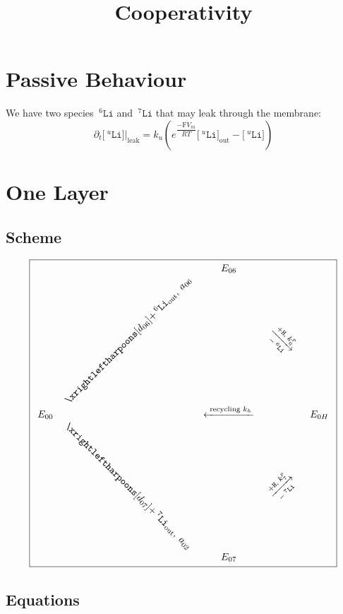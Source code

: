 \documentclass[aps,onecolumn,11pt]{revtex4}
\newcommand{\mychem}[1]{\mathtt{#1}}
\newcommand{\myconc}[1]{\big[#1\big]}
\newcommand{\Faraday}{\mathrm{F}}
\newcommand{\spLi}[1]{{\!~^{#1}\mychem{Li}}}
\newcommand{\Li}[1]{\myconc{\spLi{#1}}}
\newcommand{\spproton}{\mychem{H}}
\newcommand{\myleak}[1]{\left.{#1}\right\vert_{\mathrm{leak}}}
\newcommand{\myout}[1]{{#1}_{\mathrm{out}}}
\newcommand{\LiOut}[1]{\myout{\Li{#1}}}
\newcommand{\spLiOut}[1]{\myout{\spLi{#1}}}
\newcommand{\myrotate}[2]{\rotatebox[origin=c]{#1}{#2}}
\begin{document}
\title{Cooperativity}
\maketitle


\section{Passive Behaviour}
We have two species $\spLi{6}$ and $\spLi{7}$ that may leak through the membrane:
\begin{equation}
	\partial_t \myleak{\Li{u}} = k_u \left( e^{\dfrac{-\Faraday V_m }{RT}} \LiOut{u} - \Li{u}\right)
\end{equation}

\section{One Layer}

\subsection{Scheme}
{
\Large
\begin{equation}
\boxed{
\begin{array}{ccccc}
 & & E_{06}  &  & \\
 &  \myrotate{45}{$\xrightleftharpoons[d_{06}]{+\spLiOut{6},\;a_{06}}$} &   & \myrotate{-45}{$\xrightarrow[-\spLi{6}]{+ \spproton, \; k^p_6}$} &  \\
E_{00}  &  & \xleftarrow{\text{ recycling } k_h } &   & E_{0H} \\
  & \myrotate{-45}{$\xrightleftharpoons[d_{07}]{+\spLiOut{7},\;a_{02}}$} &   & \myrotate{+45}{$\xrightarrow[-\spLi{7}]{+ \spproton, \; k^p_7}$} & \\
 & & E_{07} & & \\
 \end{array}
 }
\end{equation}
}

\subsection{Equations}
\end{document}
